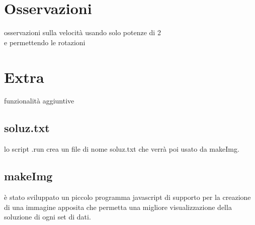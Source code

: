 
	\section{Osservazioni}
	

osservazioni sulla velocità usando solo potenze di 2
\\

e permettendo le rotazioni


	\newpage


\section{Extra}


funzionalità aggiuntive


\subsection{soluz.txt}
lo script .run crea un file di nome soluz.txt che verrà poi usato da makeImg.


\subsection{makeImg}
è stato sviluppato un piccolo programma javascript di supporto per la creazione di una immagine apposita che permetta una migliore visualizzazione della soluzione di ogni set di dati.